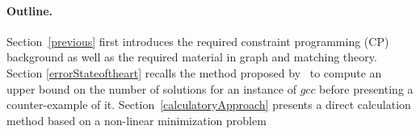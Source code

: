 \paragraph{Outline.} Section~\ref{previous} first introduces the required constraint programming (CP) background as well as the required material in graph and matching theory. Section \ref{errorStateoftheart} recalls the method proposed by~\cite{PesantQZ12} to compute an upper bound on the number of solutions for an instance of $gcc$ before presenting a counter-example of it. Section~\ref{calculatoryApproach} presents a direct calculation method based on a non\--linear minimization problem 